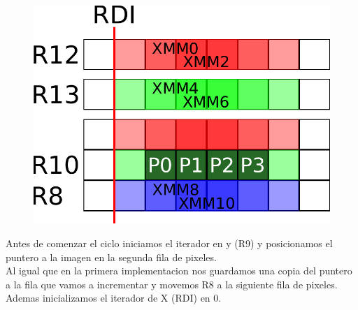 \begin{figure}[h!]
	\centering
	\includegraphics[scale=0.5]{images/BlurASM2_0}
\end{figure}

Antes de comenzar el ciclo iniciamos el iterador en y (R9) y posicionamos el puntero a la imagen en la segunda fila de pixeles. \\

Al igual que en la primera implementacion nos guardamos una copia del puntero a la fila que vamos a incrementar y movemos R8 a la siguiente fila de pixeles. Ademas inicializamos el iterador de X (RDI) en 0. \\

